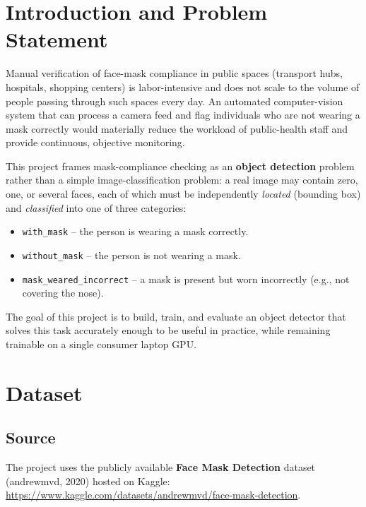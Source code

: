 \documentclass[12pt]{article}
\begin{document}
\section{Introduction and Problem Statement}

Manual verification of face-mask compliance in public spaces (transport
hubs, hospitals, shopping centers) is labor-intensive and does not scale to
the volume of people passing through such spaces every day. An automated
computer-vision system that can process a camera feed and flag individuals
who are not wearing a mask correctly would materially reduce the workload of
public-health staff and provide continuous, objective monitoring.

This project frames mask-compliance checking as an \textbf{object detection}
problem rather than a simple image-classification problem: a real image may
contain zero, one, or several faces, each of which must be independently
\textit{located} (bounding box) and \textit{classified} into one of three
categories:

\begin{itemize}[noitemsep]
    \item \texttt{with\_mask} -- the person is wearing a mask correctly.
    \item \texttt{without\_mask} -- the person is not wearing a mask.
    \item \texttt{mask\_weared\_incorrect} -- a mask is present but worn
          incorrectly (e.g., not covering the nose).
\end{itemize}

The goal of this project is to build, train, and evaluate an object
detector that solves this task accurately enough to be useful in practice,
while remaining trainable on a single consumer laptop GPU.

\section{Dataset}

\subsection{Source}
The project uses the publicly available \textbf{Face Mask Detection}
dataset (andrewmvd, 2020) hosted on Kaggle:
\url{https://www.kaggle.com/datasets/andrewmvd/face-mask-detection}.
\end{document}
